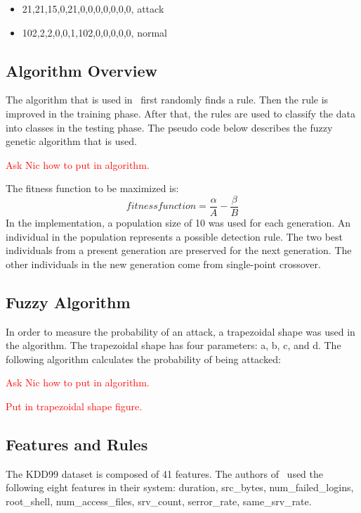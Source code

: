 \documentclass{sig-alternate}
\newcommand{\mycomment}[1]{\textcolor{red}{#1}}
\begin{document}
\begin{itemize}
\item 21,21,15,0,21,0,0,0,0,0,0,0, attack
\item 102,2,2,0,0,1,102,0,0,0,0,0, normal
\end{itemize}




\subsection{Algorithm Overview}
The algorithm that is used in~\cite{6496342, 6559603} first randomly finds a rule. Then the rule is improved in the training phase. After that, the rules are used to classify the data into classes in the testing phase. The pseudo code below describes the fuzzy genetic algorithm that is used. 

\mycomment{Ask Nic how to put in algorithm.}

The fitness function to be maximized is:
\begin{equation*}
fitness function = \frac{\alpha}{A} - \frac{\beta}{B}
\end{equation*}
In the implementation, a population size of 10 was used for each generation. An individual in the population represents a possible detection rule. The two best individuals from a present generation are preserved for the next generation. The other individuals in the new generation come from single-point crossover.




\subsection{Fuzzy Algorithm}
In order to measure the probability of an attack, a trapezoidal shape was used in the algorithm. The trapezoidal shape has four parameters: a, b, c, and d. The following algorithm calculates the probability of being attacked:

\mycomment{Ask Nic how to put in algorithm.}

\mycomment{Put in trapezoidal shape figure.}



\subsection{Features and Rules}
The KDD99 dataset is composed of 41 features. The authors of~\cite{6496342, 6559603} used the following eight features in their system: duration, src\_bytes, num\_failed\_logins, root\_shell, num\_access\_files, srv\_count, serror\_rate, same\_srv\_rate.
\end{document}

